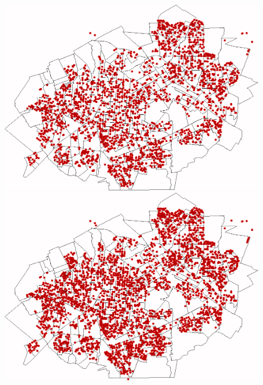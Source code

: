 \begin{figure}[H]
\begin{minipage}{.45\textwidth}
  \end{minipage}
  \begin{minipage}{.45\textwidth}
    \centering
    \includegraphics[width=1.0\textwidth]{Figuras/Resultados/Observado/01-09-2009.png}
    \captionsetup{labelformat=empty}
  \end{minipage}%
  \centering
  \begin{minipage}{.45\textwidth}
    \centering
    \includegraphics[width=1.0\textwidth]{Figuras/Resultados/Observado/01-10-2009.png}
    \captionsetup{labelformat=empty}
  \end{minipage}
  \begin{minipage}{.45\textwidth}

\end{minipage}
\end{figure}
